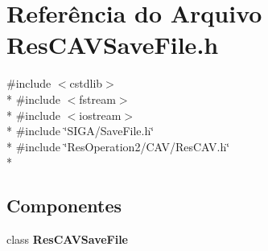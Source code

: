 \section{Referência do Arquivo Res\+C\+A\+V\+Save\+File.\+h}
\label{_2_c_a_v_2_res_c_a_v_save_file_8h}
{\ttfamily \#include $<$cstdlib$>$}\\*
{\ttfamily \#include $<$fstream$>$}\\*
{\ttfamily \#include $<$iostream$>$}\\*
{\ttfamily \#include \char`\"{}S\+I\+G\+A/\+Save\+File.\+h\char`\"{}}\\*
{\ttfamily \#include \char`\"{}Res\+Operation2/\+C\+A\+V/\+Res\+C\+A\+V.\+h\char`\"{}}\\*
\subsection*{Componentes}
\begin{DoxyCompactItemize}
\item 
class {\bf Res\+C\+A\+V\+Save\+File}
\end{DoxyCompactItemize}
